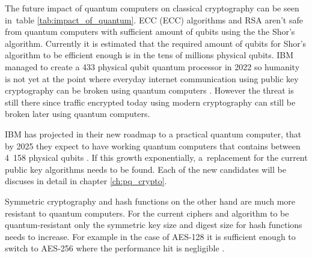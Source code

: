 The future impact of quantum computers on classical cryptography can be seen in~table \ref{tab:impact_of_quantum}. ECC (\acl{ECC}) algorithms and RSA aren't safe from quantum computers with sufficient amount of qubits using the the Shor's algorithm. Currently it is estimated that the required amount of qubits for Shor's algorithm to be efficient enough is in the tens of millions \cite{Bernstein149}\cite{Mosca2015} physical qubits. IBM managed to create a 433 physical qubit quantum processor in 2022 so humanity is not yet at the point where everyday internet communication using public key cryptography can be broken using quantum computers \cite{0MBNdFRCTLK35MFY}. However the threat is still there since traffic encrypted today using modern cryptography can still be broken later using quantum computers.

IBM has projected in their new roadmap to a practical quantum computer, that by 2025 they expect to have working quantum computers that contains between 4~158 physical qubits \cite{Gambetta2021}. If this growth exponentially, a~replacement for the current public key algorithms needs to be found. Each of the new candidates will be discuses in detail in chapter \ref{ch:pq_crypto}.

Symmetric cryptography and hash functions on the other hand are much more resistant to quantum computers. For the current ciphers and algorithm to be quantum-resistant only the symmetric key size and digest size for hash functions needs to increase. For example in the case of AES-128 it is sufficient enough to switch to AES-256 where the performance hit is negligible \cite{Bernstein149}.


